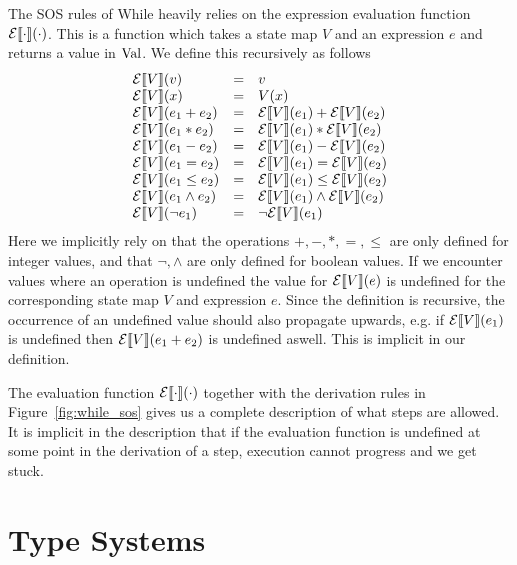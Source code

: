 The SOS rules of While heavily relies on the expression evaluation function
$\mathcal{E}\llbracket \cdot \rrbracket(\cdot)$. This is a function which takes a state map $V$ and an
expression $e$ and returns a value in $\mbox{$\mathrm{Val}$}$. We define this recursively as follows
\begin{equation*}
  \begin{array}{lll}
    \mathcal{E}\llbracket V \rrbracket(v) &=& v \\
    \mathcal{E}\llbracket V \rrbracket(x) &=& V(x) \\
    \mathcal{E}\llbracket V \rrbracket(e_1 + e_2) &=& \mathcal{E}\llbracket V \rrbracket(e_1) + \mathcal{E}\llbracket V \rrbracket(e_2) \\
    \mathcal{E}\llbracket V \rrbracket(e_1 * e_2) &=& \mathcal{E}\llbracket V \rrbracket(e_1) * \mathcal{E}\llbracket V \rrbracket(e_2) \\
    \mathcal{E}\llbracket V \rrbracket(e_1 - e_2) &=& \mathcal{E}\llbracket V \rrbracket(e_1) - \mathcal{E}\llbracket V \rrbracket(e_2) \\
    \mathcal{E}\llbracket V \rrbracket(e_1 = e_2) &=& \mathcal{E}\llbracket V \rrbracket(e_1) = \mathcal{E}\llbracket V \rrbracket(e_2) \\
    \mathcal{E}\llbracket V \rrbracket(e_1 \leq e_2) &=& \mathcal{E}\llbracket V \rrbracket(e_1) \leq \mathcal{E}\llbracket V \rrbracket(e_2) \\
    \mathcal{E}\llbracket V \rrbracket(e_1 \land e_2) &=& \mathcal{E}\llbracket V \rrbracket(e_1) \land \mathcal{E}\llbracket V \rrbracket(e_2) \\
    \mathcal{E}\llbracket V \rrbracket(\lnot e_1) &=& \lnot \mathcal{E}\llbracket V \rrbracket(e_1) \\
  \end{array}
\end{equation*}
Here we implicitly rely on that the operations $+, -, *, =, \leq$ are only
defined for integer values, and that $\lnot, \land$ are only defined for boolean
values.  If we encounter values where an operation is undefined the value for
$\mathcal{E}\llbracket V \rrbracket(e)$ is undefined for the corresponding state map $V$ and expression
$e$. Since the definition is recursive, the occurrence of an undefined value
should also propagate upwards, e.g. if $\mathcal{E}\llbracket V \rrbracket(e_1)$ is undefined
then $\mathcal{E}\llbracket V \rrbracket(e_1 + e_2)$ is undefined aswell. This is implicit in our
definition.

The evaluation function $\mathcal{E}\llbracket \cdot \rrbracket(\cdot)$ together with the derivation
rules in Figure~\ref{fig:while_sos} gives us a complete description of what
steps are allowed. It is implicit in the description that if the evaluation
function is undefined at some point in the derivation of a step, execution
cannot progress and we get stuck.


\section{Type Systems} \label{sec:type_systems}




